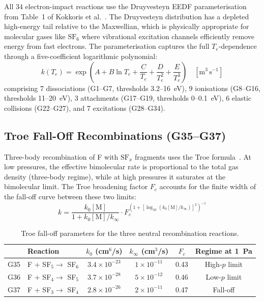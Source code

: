 \documentclass[11pt,a4paper]{report}
\newcommand{\SFx}{\mathrm{SF}_x}
\newcommand{\SFsix}{\mathrm{SF}_6}
\newcommand{\Te}{T_e}
\begin{document}
All 34 electron-impact reactions use the Druyvesteyn EEDF parameterisation from Table~1 of Kokkoris et al.~\cite{Kokkoris2009}.  The Druyvesteyn distribution has a depleted high-energy tail relative to the Maxwellian, which is physically appropriate for molecular gases like $\SFsix$ where vibrational excitation channels efficiently remove energy from fast electrons.  The parameterisation captures the full $\Te$-dependence through a five-coefficient logarithmic polynomial:
\begin{equation}
\boxed{k(\Te) = \exp\!\left(A + B\ln \Te + \frac{C}{\Te} + \frac{D}{\Te^2} + \frac{E}{\Te^3}\right) \quad [\text{m}^3\,\text{s}^{-1}]}
\label{eq:pure_krate}
\end{equation}
comprising 7 dissociations (G1--G7, thresholds 3.2--\SI{16}{\electronvolt}), 9 ionisations (G8--G16, thresholds 11--\SI{20}{\electronvolt}), 3 attachments (G17--G19, thresholds 0--\SI{0.1}{\electronvolt}), 6 elastic collisions (G22--G27), and 7 excitations (G28--G34).

\subsection{Troe Fall-Off Recombinations (G35--G37)}
\label{sec:pure_troe}

Three-body recombination of F with $\SFx$ fragments uses the Troe formula~\cite{Ryan1990,Troe1977}.  At low pressures, the effective bimolecular rate is proportional to the total gas density (three-body regime), while at high pressures it saturates at the bimolecular limit.  The Troe broadening factor $F_c$ accounts for the finite width of the fall-off curve between these two limits:
\begin{equation}
\boxed{k = \frac{k_0[\mathrm{M}]}{1 + k_0[\mathrm{M}]/k_\infty} \cdot F_c^{\left(1+\left[\log_{10}(k_0[\mathrm{M}]/k_\infty)\right]^2\right)^{-1}}}
\label{eq:pure_troe}
\end{equation}

\begin{table}[H]
\centering
\caption{Troe fall-off parameters for the three neutral recombination reactions.}
\label{tab:pure_troe}
\begin{tabular}{clcccc}
\toprule
& \textbf{Reaction} & $k_0$ (cm$^6$/s) & $k_\infty$ (cm$^3$/s) & $F_c$ & \textbf{Regime at \SI{1}{\pascal}} \\
\midrule
G35 & F + SF$_5 \to$ SF$_6$ & $3.4\times10^{-23}$ & $1\times10^{-11}$ & 0.43 & High-$p$ limit \\
G36 & F + SF$_4 \to$ SF$_5$ & $3.7\times10^{-28}$ & $5\times10^{-12}$ & 0.46 & Low-$p$ limit \\
G37 & F + SF$_3 \to$ SF$_4$ & $2.8\times10^{-26}$ & $2\times10^{-11}$ & 0.47 & Fall-off \\
\bottomrule
\end{tabular}
\end{table}
\end{document}

